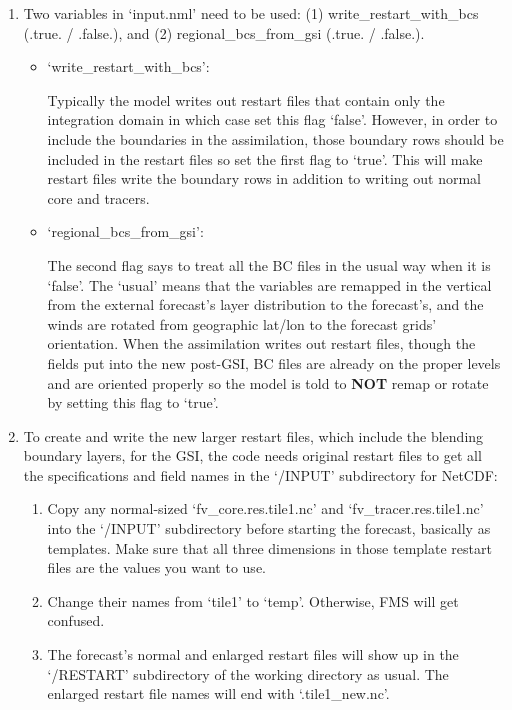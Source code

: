 \documentclass[11pt,fleqn]{report}              %
\begin{document}
\begin{enumerate}
\item Two variables in `input.nml' need to be used: (1) write\_restart\_with\_bcs (.true. / .false.), and (2) regional\_bcs\_from\_gsi (.true. / .false.). 

\begin{itemize}
\item `write\_restart\_with\_bcs':

Typically the model writes out restart files that contain only the integration domain in which case set this flag `false'. However, in order to include the boundaries in the assimilation, those boundary rows should be included in the restart files so set the first flag to `true'. This will make restart files write the boundary rows in addition to writing out normal core and tracers.

\item `regional\_bcs\_from\_gsi':

The second flag says to treat all the BC files in the usual way when it is `false'. The `usual' means that the variables are remapped in the vertical from the external forecast's layer distribution to the forecast's, and the winds are rotated from geographic lat/lon to the forecast grids' orientation. When the assimilation writes out restart files, though the fields put into the new post-GSI, BC files are already on the proper levels and are oriented properly so the model is told to {\bf NOT} remap or rotate by setting this flag to `true'.

\end{itemize}

\item To create and write the new larger restart files, which include the blending boundary layers, for the GSI, the code needs original restart files to get all the specifications and field names in the `/INPUT' subdirectory for NetCDF:

\begin{enumerate}
\item Copy any normal-sized `fv\_core.res.tile1.nc' and `fv\_tracer.res.tile1.nc' into the `/INPUT' subdirectory before starting the forecast, basically as templates. Make sure that all three dimensions in those template restart files are the values you want to use.

\item Change their names from `tile1' to `temp'. Otherwise, FMS will get confused. 

\item The forecast's normal and enlarged restart files will show up in the `/RESTART' subdirectory of the working directory as usual. The enlarged restart file names will end with `.tile1\_new.nc'.
\end{enumerate}


\end{enumerate}
\end{document}
